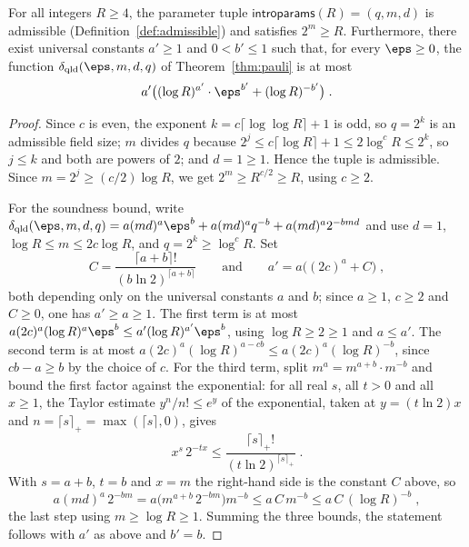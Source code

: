 \begin{lemma}\label{lem:delta-bound}
	\leanok
	For all integers $R \ge 4$, the parameter tuple $\mathsf{introparams}(R) = (q,m,d)$ is admissible (Definition~\ref{def:admissible}) and satisfies $2^m \ge R$. Furthermore, there exist universal constants $a' \ge 1$ and $0 < b' \le 1$ such that, for every $\eps \ge 0$, the function $\delta_{\mathrm{qld}}(\eps, m, d, q)$ of Theorem~\ref{thm:pauli} is at most
	\[
		a' \bigl( (\log R)^{a'} \cdot \eps^{b'} + (\log R)^{-b'} \bigr)\;.
	\]
\end{lemma}
\begin{proof}
	\leanok
	Since $c$ is even, the exponent $k = c \lceil \log\log R \rceil + 1$ is odd, so $q = 2^k$ is an admissible field size; $m$ divides $q$ because $2^j \le c \lceil \log R \rceil + 1 \le 2 \log^c R \le 2^k$, so $j \le k$ and both are powers of $2$; and $d = 1 \ge 1$. Hence the tuple is admissible. Since $m = 2^j \ge (c/2) \log R$, we get $2^m \ge R^{c/2} \ge R$, using $c \ge 2$.

	For the soundness bound, write $\delta_{\mathrm{qld}}(\eps,m,d,q) = a(md)^a \eps^b + a(md)^a q^{-b} + a(md)^a 2^{-bmd}$ and use $d = 1$, $\log R \le m \le 2c \log R$, and $q = 2^k \ge \log^c R$. Set
	\[
		C = \frac{\lceil a + b \rceil !}{(b \ln 2)^{\lceil a + b \rceil}}
		\qquad \text{and} \qquad
		a' = a\bigl( (2c)^a + C \bigr)\;,
	\]
	both depending only on the universal constants $a$ and $b$; since $a \ge 1$, $c \ge 2$ and $C \ge 0$, one has $a' \ge a \ge 1$. The first term is at most $a(2c)^a (\log R)^a \eps^b \le a' (\log R)^{a'} \eps^b$, using $\log R \ge 2 \ge 1$ and $a \le a'$. The second term is at most $a(2c)^a (\log R)^{a - cb} \le a(2c)^a (\log R)^{-b}$, since $cb - a \ge b$ by the choice of $c$. For the third term, split $m^a = m^{a+b} \cdot m^{-b}$ and bound the first factor against the exponential: for all real $s$, all $t > 0$ and all $x \ge 1$, the Taylor estimate $y^n / n! \le e^y$ of the exponential, taken at $y = (t \ln 2) x$ and $n = \lceil s \rceil_{+} = \max(\lceil s \rceil, 0)$, gives
	\[
		x^s\, 2^{-tx} \le \frac{\lceil s \rceil_{+}!}{(t \ln 2)^{\lceil s \rceil_{+}}}\;.
	\]
	With $s = a + b$, $t = b$ and $x = m$ the right-hand side is the constant $C$ above, so
	\[
		a(md)^a\, 2^{-bm}
		= a \bigl( m^{a+b}\, 2^{-bm} \bigr) m^{-b}
		\le a\, C\, m^{-b}
		\le a\, C\, (\log R)^{-b}\;,
	\]
	the last step using $m \ge \log R \ge 1$. Summing the three bounds, the statement follows with $a'$ as above and $b' = b$.
\end{proof}


